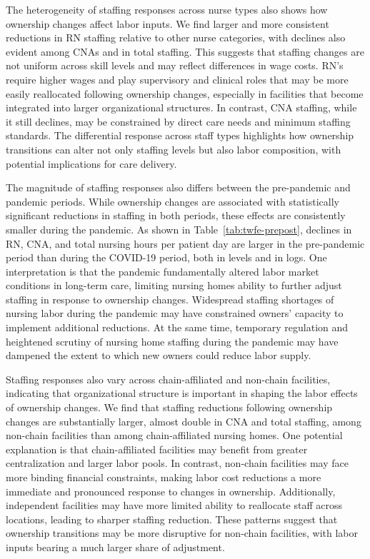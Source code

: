 \documentclass[preprint,authoryear]{elsarticle}
\begin{document}
The heterogeneity of staffing responses across nurse types also shows how ownership changes affect labor inputs. We find larger and more consistent reductions in RN staffing relative to other nurse categories, with declines also evident among CNAs and in total staffing. This suggests that staffing changes are not uniform across skill levels and may reflect differences in wage costs. RN's require higher wages and play supervisory and clinical roles that may be more easily reallocated following ownership changes, especially in facilities that become integrated into larger organizational structures. In contrast, CNA staffing, while it still declines, may be constrained by direct care needs and minimum staffing standards. The differential response across staff types highlights how ownership transitions can alter not only staffing levels but also labor composition, with potential implications for care delivery.

The magnitude of staffing responses also differs between the pre-pandemic and pandemic periods. While ownership changes are associated with statistically significant reductions in staffing in both periods, these effects are consistently smaller during the pandemic. As shown in Table~\ref{tab:twfe-prepost}, declines in RN, CNA, and total nursing hours per patient day are larger in the pre-pandemic period than during the COVID-19 period, both in levels and in logs. One interpretation is that the pandemic fundamentally altered labor market conditions in long-term care, limiting nursing homes ability to further adjust staffing in response to ownership changes. Widespread staffing shortages of nursing labor during the pandemic may have constrained owners’ capacity to implement additional reductions. At the same time, temporary regulation and heightened scrutiny of nursing home staffing during the pandemic may have dampened the extent to which new owners could reduce labor supply.

Staffing responses also vary across chain-affiliated and non-chain facilities, indicating that organizational structure is important in shaping the labor effects of ownership changes. We find that staffing reductions following ownership changes are substantially larger, almost double in CNA and total staffing, among non-chain facilities than among chain-affiliated nursing homes. One potential explanation is that chain-affiliated facilities may benefit from greater centralization and larger labor pools. In contrast, non-chain facilities may face more binding financial constraints, making labor cost reductions a more immediate and pronounced response to changes in ownership. Additionally, independent facilities may have more limited ability to reallocate staff across locations, leading to sharper staffing reduction. These patterns suggest that ownership transitions may be more disruptive for non-chain facilities, with labor inputs bearing a much larger share of adjustment.
\end{document}
